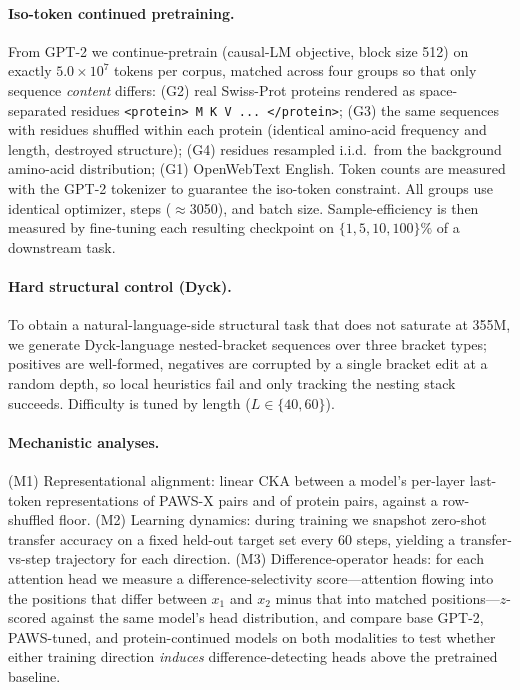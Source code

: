 \documentclass[11pt]{article}
\begin{document}
\paragraph{Iso-token continued pretraining.} From GPT-2 we continue-pretrain (causal-LM objective,
block size 512) on exactly $5.0\times10^{7}$ tokens per corpus, matched across four groups so that
only sequence \emph{content} differs: (G2) real Swiss-Prot proteins rendered as space-separated
residues \texttt{<protein> M K V ... </protein>}; (G3) the same sequences with residues shuffled
within each protein (identical amino-acid frequency and length, destroyed structure); (G4) residues
resampled i.i.d.\ from the background amino-acid distribution; (G1) OpenWebText English. Token
counts are measured with the GPT-2 tokenizer to guarantee the iso-token constraint. All groups use
identical optimizer, steps ($\approx$3050), and batch size. Sample-efficiency is then measured by
fine-tuning each resulting checkpoint on $\{1,5,10,100\}\%$ of a downstream task.

\paragraph{Hard structural control (Dyck).} To obtain a natural-language-side structural task that
does not saturate at 355M, we generate Dyck-language nested-bracket sequences over three bracket
types; positives are well-formed, negatives are corrupted by a single bracket edit at a random
depth, so local heuristics fail and only tracking the nesting stack succeeds. Difficulty is tuned
by length ($L\in\{40,60\}$).

\paragraph{Mechanistic analyses.} (M1) Representational alignment: linear CKA \cite{zhang2019cka}
between a model's per-layer last-token representations of PAWS-X pairs and of protein pairs, against
a row-shuffled floor. (M2) Learning dynamics: during training we snapshot zero-shot transfer
accuracy on a fixed held-out target set every 60 steps, yielding a transfer-vs-step trajectory for
each direction. (M3) Difference-operator heads: for each attention head we measure a
difference-selectivity score---attention flowing into the positions that differ between $x_1$ and
$x_2$ minus that into matched positions---$z$-scored against the same model's head distribution, and
compare base GPT-2, PAWS-tuned, and protein-continued models on both modalities to test whether
either training direction \emph{induces} difference-detecting heads above the pretrained baseline.
\end{document}
